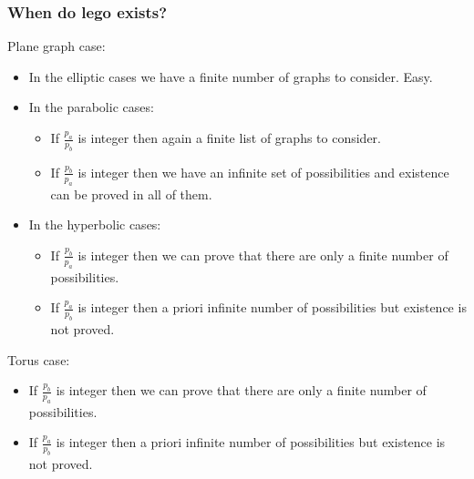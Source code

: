 \documentclass{beamer}
\begin{document}
\begin{frame}
  \frametitle{When do lego exists?}

Plane graph case:
\begin{itemize}
\item In the elliptic cases we have a finite number of graphs to consider. Easy.
\item In the parabolic cases:
  \begin{itemize}
  \item If $\frac{p_a}{p_b}$ is integer then again a finite list of graphs to consider.
  \item If $\frac{p_b}{p_a}$ is integer then we have an infinite set of possibilities and existence can be proved in all of them.
  \end{itemize}
\item In the hyperbolic cases:
  \begin{itemize}
  \item If $\frac{p_b}{p_a}$ is integer then we can prove that there are only a finite number of possibilities.
  \item If $\frac{p_a}{p_b}$ is integer then a priori infinite number of possibilities but existence is not proved.
  \end{itemize}
\end{itemize}
Torus case:
\begin{itemize}
\item If $\frac{p_b}{p_a}$ is integer then we can prove that there are only a finite number of possibilities.
\item If $\frac{p_a}{p_b}$ is integer then a priori infinite number of possibilities but existence is not proved.
\end{itemize}

\end{frame}
  
\end{document}
